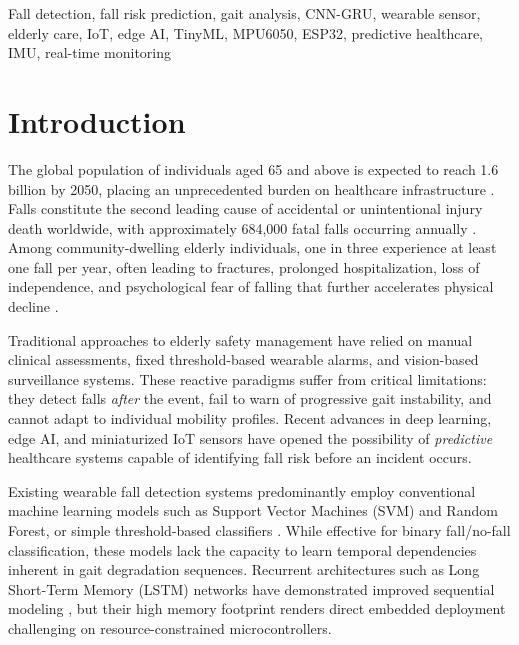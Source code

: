 \documentclass[conference]{IEEEtran}
\begin{document}
\begin{IEEEkeywords}
Fall detection, fall risk prediction, gait analysis, CNN-GRU, wearable sensor, elderly care, IoT, edge AI, TinyML, MPU6050, ESP32, predictive healthcare, IMU, real-time monitoring
\end{IEEEkeywords}

\section{Introduction}

The global population of individuals aged 65 and above is expected to reach 1.6 billion by 2050, placing an unprecedented burden on healthcare infrastructure \cite{who2021}. Falls constitute the second leading cause of accidental or unintentional injury death worldwide, with approximately 684,000 fatal falls occurring annually \cite{who2021}. Among community-dwelling elderly individuals, one in three experience at least one fall per year, often leading to fractures, prolonged hospitalization, loss of independence, and psychological fear of falling that further accelerates physical decline \cite{ishaq2026}.

Traditional approaches to elderly safety management have relied on manual clinical assessments, fixed threshold-based wearable alarms, and vision-based surveillance systems. These reactive paradigms suffer from critical limitations: they detect falls \textit{after} the event, fail to warn of progressive gait instability, and cannot adapt to individual mobility profiles. Recent advances in deep learning, edge AI, and miniaturized IoT sensors have opened the possibility of \textit{predictive} healthcare systems capable of identifying fall risk before an incident occurs.

Existing wearable fall detection systems predominantly employ conventional machine learning models such as Support Vector Machines (SVM) and Random Forest, or simple threshold-based classifiers \cite{attal2015, kumar2024}. While effective for binary fall/no-fall classification, these models lack the capacity to learn temporal dependencies inherent in gait degradation sequences. Recurrent architectures such as Long Short-Term Memory (LSTM) networks have demonstrated improved sequential modeling \cite{zhang2025}, but their high memory footprint renders direct embedded deployment challenging on resource-constrained microcontrollers.
\end{document}
